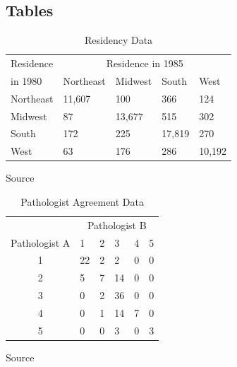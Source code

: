 \documentclass[a4paper]{article}
\begin{document}
 
\begin{appendix}

\newpage

\section{Tables}
\begin{table}[H]
\begin{center}
\begin{tabular}{lllll} \hline
Residence & \multicolumn{4}{c}{Residence in 1985} \\ \cline{2-5}
in 1980 & Northeast & Midwest & South & West \\ \hline
Northeast & 11,607  & 100     & 366    & 124    \\
Midwest   & 87      & 13,677  & 515    & 302    \\
South     & 172     & 225     & 17,819 & 270    \\
West      & 63      & 176     & 286    & 10,192 \\ \hline
\end{tabular}
\caption{Residency Data}
\label{tab:res}
\end{center}
Source \cite{agre:1990}
\end{table}

\begin{table}[H]
\begin{center}
\begin{tabular}{clllll}  \hline
& \multicolumn{5}{c}{Pathologist B}  \\ \cline{2-6}
Pathologist A & 1 & 2 & 3 & 4 & 5 \\ \hline
1 & 22 & 2 & 2 & 0 & 0 \\
2 & 5  & 7 & 14 & 0 & 0 \\
3 & 0 & 2 & 36 & 0 & 0 \\
4 & 0 & 1 & 14 & 7 & 0 \\
5 & 0 & 0 & 3 & 0 & 3 \\ \hline
\end{tabular} 
\caption{Pathologist Agreement Data}
\label{tab:path}
\end{center}
Source \cite{agre:1990}
\end{table}



\end{appendix}
\end{document}

